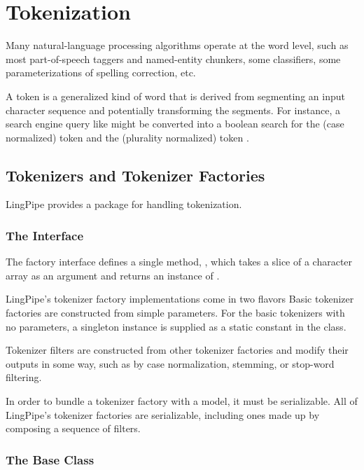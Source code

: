 \chapter{Tokenization}\label{chapter:tokenization}

Many natural-language processing algorithms operate at the word level,
such as most part-of-speech taggers and named-entity chunkers, some
classifiers, some parameterizations of spelling correction, etc.

A token is a generalized kind of word that is derived from segmenting
an input character sequence and potentially transforming the segments.
For instance, a search engine query like
 might be converted into a boolean
search for the (case normalized) token  and the
(plurality normalized) token .

\section{Tokenizers and Tokenizer Factories}

LingPipe provides a package  for handling
tokenization.  

\subsection{The  Interface}

The  factory interface defines a single method,
, which takes a slice of a character
array as an argument and returns an instance of .

LingPipe's tokenizer factory implementations come in two flavors Basic
tokenizer factories are constructed from simple parameters.  For the
basic tokenizers with no parameters, a singleton instance is supplied
as a static constant in the class.  

Tokenizer filters are constructed from other tokenizer factories and
modify their outputs in some way, such as by case normalization,
stemming, or stop-word filtering.

In order to bundle a tokenizer factory with a model, it must be
serializable.  All of LingPipe's tokenizer factories are serializable,
including ones made up by composing a sequence of filters.


\subsection{The  Base Class}

